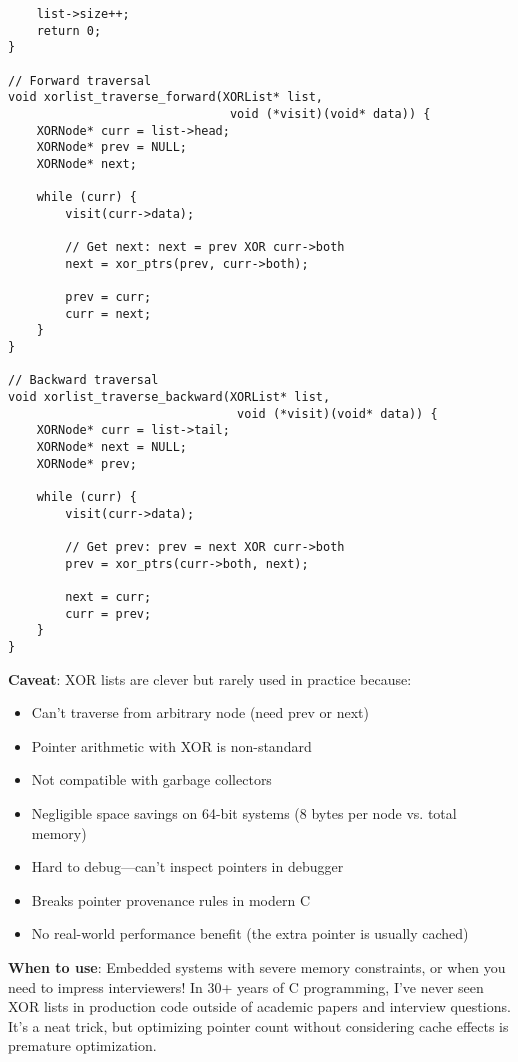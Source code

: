 \begin{lstlisting}
    list->size++;
    return 0;
}

// Forward traversal
void xorlist_traverse_forward(XORList* list,
                               void (*visit)(void* data)) {
    XORNode* curr = list->head;
    XORNode* prev = NULL;
    XORNode* next;

    while (curr) {
        visit(curr->data);

        // Get next: next = prev XOR curr->both
        next = xor_ptrs(prev, curr->both);

        prev = curr;
        curr = next;
    }
}

// Backward traversal
void xorlist_traverse_backward(XORList* list,
                                void (*visit)(void* data)) {
    XORNode* curr = list->tail;
    XORNode* next = NULL;
    XORNode* prev;

    while (curr) {
        visit(curr->data);

        // Get prev: prev = next XOR curr->both
        prev = xor_ptrs(curr->both, next);

        next = curr;
        curr = prev;
    }
}
\end{lstlisting}

\textbf{Caveat}: XOR lists are clever but rarely used in practice because:

\begin{itemize}
    \item Can't traverse from arbitrary node (need prev or next)
    \item Pointer arithmetic with XOR is non-standard
    \item Not compatible with garbage collectors
    \item Negligible space savings on 64-bit systems (8 bytes per node vs. total memory)
    \item Hard to debug—can't inspect pointers in debugger
    \item Breaks pointer provenance rules in modern C
    \item No real-world performance benefit (the extra pointer is usually cached)
\end{itemize}

\textbf{When to use}: Embedded systems with severe memory constraints, or when you need to impress interviewers! In 30+ years of C programming, I've never seen XOR lists in production code outside of academic papers and interview questions. It's a neat trick, but optimizing pointer count without considering cache effects is premature optimization.

